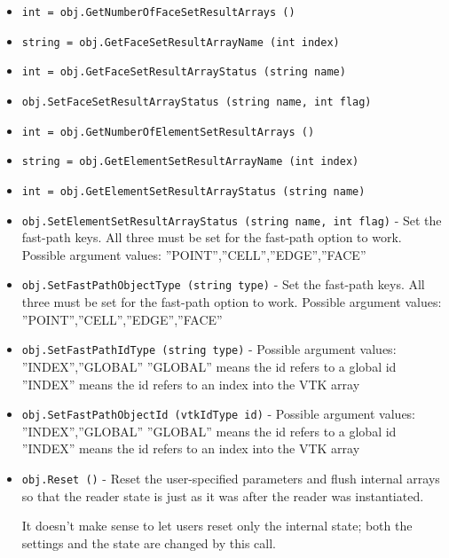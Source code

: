 \begin{itemize}
\item  \verb|int = obj.GetNumberOfFaceSetResultArrays ()|

\item  \verb|string = obj.GetFaceSetResultArrayName (int index)|

\item  \verb|int = obj.GetFaceSetResultArrayStatus (string name)|

\item  \verb|obj.SetFaceSetResultArrayStatus (string name, int flag)|

\item  \verb|int = obj.GetNumberOfElementSetResultArrays ()|

\item  \verb|string = obj.GetElementSetResultArrayName (int index)|

\item  \verb|int = obj.GetElementSetResultArrayStatus (string name)|

\item  \verb|obj.SetElementSetResultArrayStatus (string name, int flag)| -  Set the fast-path keys. All three must be set for the fast-path
 option to work.
 Possible argument values: ''POINT'',''CELL'',''EDGE'',''FACE''

\item  \verb|obj.SetFastPathObjectType (string type)| -  Set the fast-path keys. All three must be set for the fast-path
 option to work.
 Possible argument values: ''POINT'',''CELL'',''EDGE'',''FACE''

\item  \verb|obj.SetFastPathIdType (string type)| -  Possible argument values: ''INDEX'',''GLOBAL''
 ''GLOBAL'' means the id refers to a global id
 ''INDEX'' means the id refers to an index into the VTK array

\item  \verb|obj.SetFastPathObjectId (vtkIdType id)| -  Possible argument values: ''INDEX'',''GLOBAL''
 ''GLOBAL'' means the id refers to a global id
 ''INDEX'' means the id refers to an index into the VTK array

\item  \verb|obj.Reset ()| -  Reset the user-specified parameters and flush internal arrays
 so that the reader state is just as it was after the reader was
 instantiated.

 It doesn't make sense to let users reset only the internal state;
 both the settings and the state are changed by this call.


\end{itemize}
